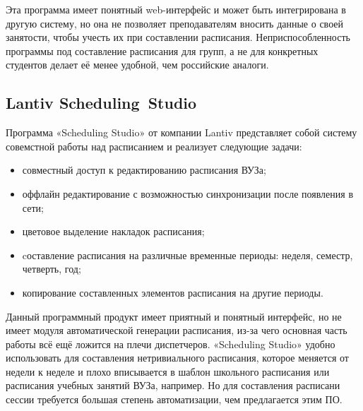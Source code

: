 Эта программа имеет понятный web-интерфейс и может быть интегрирована в другую систему, но она не позволяет преподавателям вносить данные о своей занятости, чтобы учесть их при составлении расписания. Неприспособленность программы под составление расписания для групп, а не для конкретных студентов делает её менее удобной, чем российские аналоги.

\subsection {Lantiv Scheduling Studio} 
\cite{https://scheduling-studio.lantiv.com/}
Программа «Scheduling Studio» от компании Lantiv представляет собой систему совемстной работы над расписанием и реализует следующие задачи:

\begin{itemize}
	\item совместный доступ к редактированию расписания ВУЗа;
	\item оффлайн редактирование с возможностью синхронизации после появления в сети;
	\item цветовое выделение накладок расписания;
	\item cоставление расписания на различные временные периоды: неделя, семестр, четверть, год;
	\item копирование составленных элементов расписания на другие периоды.
\end{itemize}

Данный программный продукт имеет приятный и понятный интерфейс, но не имеет модуля автоматической генерации расписания, из-за чего основная часть работы всё ещё ложится на плечи диспетчеров. «Scheduling Studio» удобно использовать для составления нетривиального расписания, которое меняется от недели к неделе и плохо вписывается в шаблон школьного расписания или расписания учебных занятий ВУЗа, например. Но для составления расписани сессии требуется большая степень автоматизации, чем предлагается этим ПО.

